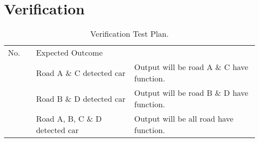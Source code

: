 \section{Verification}
\newcommand*{\mline}[1]{%
	\begingroup
	\renewcommand*{\arraystretch}{1.8}%
	\begin{tabular}[c]{@{}>{\raggedright\arraybackslash}p{\linewidth}@{}}#1\end{tabular}%
	\endgroup
}
\begin{table}[ht]
	\centering
	\renewcommand\arraystretch{1.8}
	\caption{Verification Test Plan.\label{tab:testplan}}
	\begin{NiceTabular}[t]{c>{\centering\arraybackslash}m{2.5cm}XX}
		\toprule
		No.            &                                                                   & Expected Outcome                                                                                                                                                                                                                                                                                                     \\
		\cmidrule(rl){1-1}\cmidrule(rl){2-3}\cmidrule(rl){4-4}
		 &                                                                   & Road A \& C detected car                                                                                                                                                                 & Output will be road A \& C have function.                                                                                 \\
		\cmidrule(lr){3-3}\cmidrule(lr){4-4}
		               &                                                                                                & Road B \& D detected car                                                                                                                                                                 & Output will be road B \& D have function.                                                                                 \\
		\cmidrule(lr){3-3}\cmidrule(lr){4-4}
		               &                                                                                                & Road A, B, C \& D detected car                                                                                                                                                           & Output will be all road have function.                                                                                    \\

\end{NiceTabular}
\end{table}
